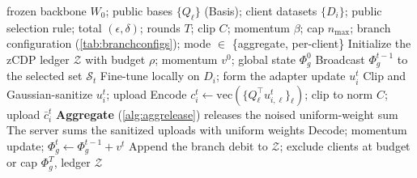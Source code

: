 \documentclass[a4paper,fleqn]{cas-dc}
\newcommand{\method}{\textsc{FedGauss}}
\begin{document}
\par
\begin{algorithm}[tbp]
\caption{\method\ round procedure (Overview)}
\label{alg:overview}
\begin{algorithmic}[1]
\Require frozen backbone $W_0$; public bases $\{Q_\ell\}$ (Basis); client datasets $\{D_i\}$; public selection rule; total $(\epsilon,\delta)$; rounds $T$; clip $C$; momentum $\beta$; cap $n_{\max}$; branch configuration (\cref{tab:branchconfigs}); mode $\in$ \{aggregate, per-client\}
\State Initialize the zCDP ledger $\mathcal{Z}$ with budget $\rho$; momentum $v^0$; global state $\Phi_g^0$
\State Broadcast $\Phi_g^{t-1}$ to the selected set $\mathcal{S}_t$ 
\State Fine-tune locally on $D_i$; form the adapter update $u_i^t$
\State Clip and Gaussian-sanitize $u_i^t$; upload 
\Else
\State Encode $c_i^t\gets\mathrm{vec}(\{Q_\ell^\top u_{i,\ell}^t\}_\ell)$; clip to norm $C$; upload $\bar c_i^t$
\EndIf
\EndFor
{}
\State \textbf{Aggregate} (\cref{alg:aggrelease}) releases the noised uniform-weight sum
\Else
\State The server sums the sanitized uploads with uniform weights
\EndIf
\State Decode; momentum update; $\Phi_g^t\gets\Phi_g^{t-1}+v^t$ 
\State Append the branch debit to $\mathcal{Z}$; exclude clients at budget or cap
\EndFor
\State \Return $\Phi_g^{T}$, ledger $\mathcal{Z}$
\end{algorithmic}
\end{algorithm}
\par
\end{document}
